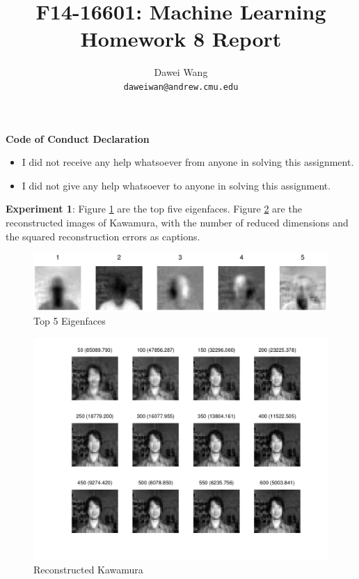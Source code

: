 \documentclass{article}
\begin{document}
\title{F14-16601: Machine Learning \\ Homework 8 Report}
\author{Dawei Wang \\ {\tt daweiwan@andrew.cmu.edu}}
\maketitle
	
{\bf Code of Conduct Declaration} 	
\begin{itemize}\parskip0pt
	\item I did not receive any help whatsoever from anyone in solving this assignment. 
	\item I did not give any help whatsoever to anyone in solving this assignment. 
\end{itemize}

{\bf Experiment 1}: Figure \ref{top5ef} are the top five eigenfaces. 
Figure \ref{kawamura} are the reconstructed images of Kawamura, with the number
of reduced dimensions and the squared reconstruction errors as captions. 

\begin{figure}[h]
	\centering
	\includegraphics[width=0.5\paperwidth]{top5ef.png}
	\caption{Top 5 Eigenfaces}\label{top5ef}
\end{figure}

\begin{figure}[h]
	\centering
	\includegraphics[width=0.5\paperwidth]{kawamura.png}
	\caption{Reconstructed Kawamura}\label{kawamura}
\end{figure}
\end{document}
